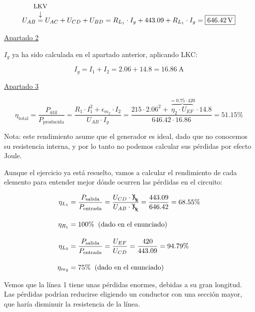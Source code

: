 \begin{example}
\begin{itemize}
        \vspace{-9mm}
        \[
          U_{AB} \overarrow[=][\downarrow]{\small LKV} U_{AC} + U_{CD}
          + U_{BD} = R_{L_1}\cdot I_g + 443.09 + R_{L_1}\cdot I_g =
          \boxed{ \qty{646.42}{\volt} }
        \]
        
      \end{itemize}
    
    
      \vspace{2mm}
    
      \underline{Apartado 2}
    
      \vspace{4mm}
    
      $I_g$ ya ha sido calculada en el apartado anterior, aplicando
      LKC:
    
    \[
      I_g = I_1 + I_2 = 2.06 + 14.8 = \boxed{ \qty{16.86}{\ampere} }
    \]
    
    \vspace{2mm}
    
    \underline{Apartado 3}
    
    \vspace{-3mm}
    
    \[
      \eta_{\textrm{total}} =
      \frac{P_{\textrm{útil}}}{P_{\textrm{producida}}} =
      \frac{R_1\cdot I_1^2 + \epsilon_{m_2} \cdot I_2}{U_{AB} \cdot
        I_g} = \frac{215 \cdot 2.06^2 + \overbrace{\eta_2 \cdot
          U_{EF}}^{=0.75\cdot 420} \cdot 14.8}{646.42 \cdot 16.86} =
      \boxed{51.15\%}
    \]
    
    Nota: este rendimiento asume que el generador es ideal, dado que
    no conocemos su resistencia interna, y por lo tanto no podemos
    calcular sus pérdidas por efecto Joule.

    \vspace{2mm} Aunque el ejercicio ya está resuelto, vamos a
    calcular el rendimiento de cada elemento para entender mejor dónde
    ocurren las pérdidas en el circuito:

    \vspace{-3mm}
    \begin{align*}
      \eta_{L_1} &= \frac{P_{\textrm{salida}}}{P_{\textrm{entrada}}} = \frac{U_{CD}\cdot \bcancel{I_g}}{U_{AB} \cdot \bcancel{I_g}} = \frac{443.09}{646.42} = 68.55\%\\[10pt]
      \eta_{R_1} &= 100\% \;\; \text{(dado en el enunciado)}\\[10pt]
      \eta_{L_2} &= \frac{P_{\textrm{salida}}}{P_{\textrm{entrada}}} = \frac{U_{EF}}{U_{CD}} = \frac{420}{443.09} = 94.79\%\\[10pt]
      \eta_{m_2} &= 75\% \;\; \text{(dado en el enunciado)}  
    \end{align*}
    
    Vemos que la línea 1 tiene unas pérdidas enormes, debidas a su
    gran longitud. Las pérdidas podrían reducirse eligiendo un
    conductor con una sección mayor, que haría disminuir la
    resistencia de la línea.

  \end{example}


